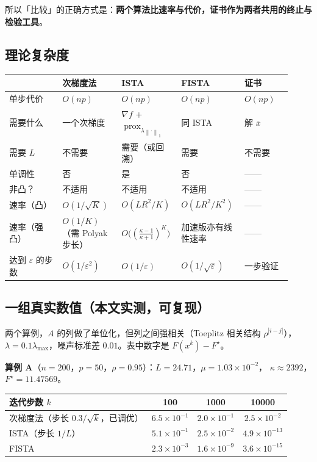 \documentclass[11pt,a4paper,UTF8]{ctexart}
\theoremstyle{plain}
\theoremstyle{definition}
\theoremstyle{remark}
\newcommand{\norm}[1]{\left\lVert #1 \right\rVert}
\newcommand{\abs}[1]{\left\lvert #1 \right\rvert}
\newcommand{\prox}{\operatorname{prox}}
\newcommand{\eps}{\varepsilon}
\begin{document}
所以「比较」的正确方式是：\textbf{两个算法比速率与代价，证书作为两者共用的终止与检验工具}。

\subsection{理论复杂度}

\begin{center}
\small
\begin{tabular}{@{}p{0.18\linewidth}p{0.20\linewidth}p{0.18\linewidth}p{0.20\linewidth}p{0.16\linewidth}@{}}
\toprule
 & 次梯度法 & ISTA & FISTA & 证书\\
\midrule

单步代价 & $O(np)$ & $O(np)$ & $O(np)$ & $O(np)$\\
需要什么 & 一个次梯度 & $\nabla f$ + $\prox_{\lambda\norm\cdot_1}$ & 同 ISTA & 解 $\bar x$\\
需要 $L$ & 不需要 & 需要（或回溯） & 需要 & 不需要\\
单调性 & 否 & 是 & 否 & ——\\
非凸？& 不适用 & 不适用 & 不适用 & ——\\
速率（凸）& $O(1/\sqrt K)$ & $O(LR^2/K)$ & $O(LR^2/K^2)$ & ——\\
速率（强凸）& $O(1/K)$（需 Polyak 步长）& $O\bigl((\frac{\kappa-1}{\kappa+1})^K\bigr)$ & 加速版亦有线性速率 & ——\\
达到 $\eps$ 的步数 & $O(1/\eps^2)$ & $O(1/\eps)$ & $O(1/\sqrt\eps)$ & 一步验证\\
\bottomrule
\end{tabular}
\end{center}

\subsection{一组真实数值（本文实测，可复现）}

两个算例，$A$ 的列做了单位化，但列之间强相关（Toeplitz 相关结构 $\rho^{\abs{i-j}}$），
$\lambda=0.1\lambda_{\max}$，噪声标准差 $0.01$。表中数字是 $F(x^k)-F^\star$。

\textbf{算例 A}（$n=200$，$p=50$，$\rho=0.95$）：$L=24.71$，$\mu=1.03\times10^{-2}$，
$\kappa\approx2392$，$F^\star=11.47569$。

\begin{center}
\small
\begin{tabular}{@{}lccc@{}}
\toprule
迭代步数 $k$ & 100 & 1000 & 10000\\
\midrule
次梯度法（步长 $0.3/\sqrt k$，已调优）& $6.5\times10^{-1}$ & $2.0\times10^{-1}$ & $2.5\times10^{-2}$\\
ISTA（步长 $1/L$）& $5.1\times10^{-1}$ & $2.5\times10^{-2}$ & $4.9\times10^{-13}$\\
FISTA & $2.3\times10^{-3}$ & $1.6\times10^{-9}$ & $3.6\times10^{-15}$\\
\bottomrule
\end{tabular}
\end{center}
\end{document}
